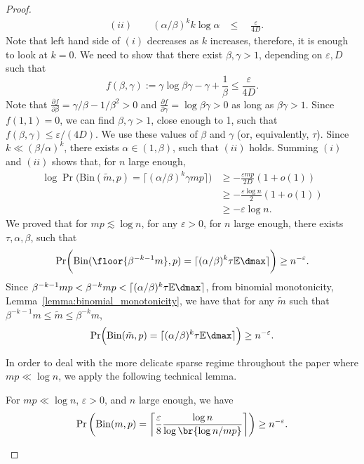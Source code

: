 \begin{proof}
\begin{equation*}
\begin{aligned}
        &(ii) \qquad (\alpha/\beta)^k k \log \alpha & \leq \quad \frac{\varepsilon}{4D}.
    \end{aligned}
\end{equation*}
Note that left hand side of \((i)\) decreases as \(k\) increases, therefore, it is enough to look at \(k = 0\). We need to show that there exist \(\beta, \gamma > 1\), depending on \(\varepsilon, D\) such that
\begin{equation*}
    f(\beta, \gamma) := \gamma \log \beta \gamma - \gamma + \frac{1}{\beta} \leq \frac{\varepsilon}{4D}.
\end{equation*}
Note that \(\frac{\partial f}{\partial \beta} = \gamma / \beta - 1 / \beta^2 > 0\) and \(\frac{\partial f}{\partial \gamma} = \log \beta \gamma > 0\) as long as \(\beta \gamma > 1\). Since \(f(1, 1) = 0\), we can find \(\beta, \gamma > 1\), close enough to 1, such that \(f(\beta, \gamma) \leq \varepsilon / (4D)\).
We use these values of \(\beta\) and \(\gamma\) (or, equivalently, \(\tau\)). Since \(k \ll (\beta / \alpha)^k\), there exists \(\alpha \in (1, \beta)\), such that \((ii)\) holds. Summing \((i)\) and \((ii)\) shows that, for \(n\) large enough,
\begin{align*}
    \log \Pr\biggl(\mathrm{Bin}(\tilde m, p) = \bigl\lceil (\alpha / \beta)^k \gamma mp\bigr\rceil \biggr) &\geq - \frac{\varepsilon mp}{2D}(1 + o(1)) \\
    &\geq - \frac{\varepsilon \log n}{2} (1+o(1)) \\
    &\geq -\varepsilon \log n.
\end{align*}
    We proved that for \(mp \lesssim \log n\), for any \(\varepsilon > 0\), for \(n\) large enough, there exists \(\tau, \alpha, \beta\), such that
       \begin{equation*}
        \mathrm{Pr}\biggl(\mathrm{Bin}(\floor {\beta^{-k-1} m}, p) = \lceil(\alpha/\beta)^k \tau \mathbb{E}\dmax\rceil \biggr) \geq n^{-\varepsilon}.
    \end{equation*}
    Since \(\beta^{-k-1}mp < \beta^{-k}mp < \lceil(\alpha/\beta)^k \tau \mathbb{E}\dmax\rceil\), from binomial monotonicity, Lemma~\ref{lemma:binomial_monotonicity}, we have that for any \(\tilde m\) such that \(\beta^{-k - 1} m \leq \tilde m \leq \beta^{-k} m\),
    \begin{equation*}
    \Pr\Bigl(\mathrm{Bin}(\tilde m, p) = \lceil(\alpha / \beta)^k \tau \mathbb{E}\dmax\rceil \Bigr) \geq n^{-\varepsilon}.
    \end{equation*}

In order to deal with the more delicate sparse regime throughout the paper where $mp \ll \log n$, we apply the following technical lemma. 
%
\begin{lemma}
\label{lemma:mp<logn_conquering_logn}
For $mp \ll \log{n}$, $\varepsilon > 0$, and $n$ large enough, we have 
\begin{equation*}
\Pr\left(\mathrm{Bin}(m, p) = \left\lceil{\frac{\varepsilon}{8} \frac{\log{n}}{\log\br{\log n / mp}}}\right\rceil \right) \geq n^{-\varepsilon}.
\end{equation*}
\end{lemma}
%
\end{proof}
